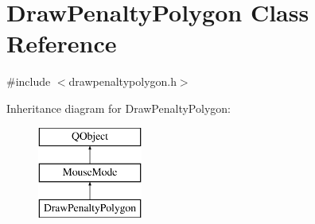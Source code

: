 \hypertarget{class_draw_penalty_polygon}{}\section{Draw\+Penalty\+Polygon Class Reference}
\label{class_draw_penalty_polygon}


{\ttfamily \#include $<$drawpenaltypolygon.\+h$>$}

Inheritance diagram for Draw\+Penalty\+Polygon\+:\begin{figure}[H]
\begin{center}
\leavevmode
\includegraphics[height=3.000000cm]{dd/d17/class_draw_penalty_polygon}
\end{center}
\end{figure}
